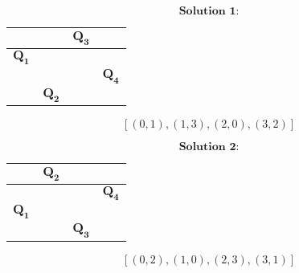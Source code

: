 \documentclass{article}
\begin{document}
\begin{center}
    \begin{minipage}{0.45\textwidth}
        \centering
        \[
            \textbf{Solution 1:}
        \]
        \begin{tabular}{|c|c|c|c|}
            \hline
                                      &                           & $\mathbf{Q}_{\mathbf{3}}$ &                           \\
            \hline
            $\mathbf{Q}_{\mathbf{1}}$ &                           &                           &                           \\
            \hline
                                      &                           &                           & $\mathbf{Q}_{\mathbf{4}}$ \\
            \hline
                                      & $\mathbf{Q}_{\mathbf{2}}$ &                           &                           \\
            \hline
        \end{tabular}

        \[
            [(0, 1), (1, 3), (2, 0), (3, 2)]
        \]
    \end{minipage}
    \hspace{0.05\textwidth}
    \begin{minipage}{0.45\textwidth}
        \centering
        \[
            \textbf{Solution 2:}
        \]
        \begin{tabular}{|c|c|c|c|}
            \hline
                                      & $\mathbf{Q}_{\mathbf{2}}$ &                           &                           \\
            \hline
                                      &                           &                           & $\mathbf{Q}_{\mathbf{4}}$ \\
            \hline
            $\mathbf{Q}_{\mathbf{1}}$ &                           &                           &                           \\
            \hline
                                      &                           & $\mathbf{Q}_{\mathbf{3}}$ &                           \\
            \hline
        \end{tabular}

        \[
            [(0, 2), (1, 0), (2, 3), (3, 1)]
        \]
    \end{minipage}
\end{center}
\end{document}
